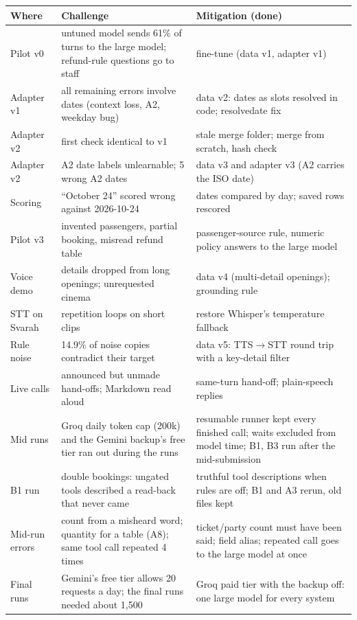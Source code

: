 \documentclass[11pt,a4paper]{article}
\newcommand{\cmd}[1]{{\small\ttfamily\def\_{\textunderscore\allowbreak}#1}}  %
\begin{document}
\begin{table}[tbp]
\centering\small
\begin{tabularx}{\linewidth}{@{}lLL@{}}
\toprule
Where & Challenge & Mitigation (done) \\
\midrule
Pilot v0 & untuned model sends 61\% of turns to the large model; refund-rule questions go to staff & fine-tune (data v1, adapter v1) \\
Adapter v1 & all remaining errors involve dates (context loss, A2, weekday bug) & data v2: dates as slots resolved in code; \cmd{resolve\_date} fix \\
Adapter v2 & first check identical to v1 & stale merge folder; merge from scratch, hash check \\
Adapter v2 & A2 date labels unlearnable; 5 wrong A2 dates & data v3 and adapter v3 (A2 carries the ISO date) \\
Scoring & ``October 24'' scored wrong against 2026-10-24 & dates compared by day; saved rows rescored \\
Pilot v3 & invented passengers, partial booking, misread refund table & passenger-source rule, numeric policy answers to the large model \\
Voice demo & details dropped from long openings; unrequested cinema & data v4 (multi-detail openings); grounding rule \\
STT on Svarah & repetition loops on short clips & restore Whisper's temperature fallback \\
Rule noise & 14.9\% of noise copies contradict their target & data v5: TTS$\rightarrow$STT round trip with a key-detail filter \\
Live calls & announced but unmade hand-offs; Markdown read aloud & same-turn hand-off; plain-speech replies \\
Mid runs & Groq daily token cap (200k) and the Gemini backup's free tier ran out during the runs & resumable runner kept every finished call; waits excluded from model time; B1, B3 run after the mid-submission \\
B1 run & double bookings: ungated tools described a read-back that never came & truthful tool descriptions when rules are off; B1 and A3 rerun, old files kept \\
Mid-run errors & count from a misheard word; \cmd{quantity} for a table (A8); same tool call repeated 4 times & ticket/party count must have been said; field alias; repeated call goes to the large model at once \\
Final runs & Gemini's free tier allows 20 requests a day; the final runs needed about 1,500 & Groq paid tier with the backup off: one large model for every system \\

\end{tabularx}
\end{table}
\end{document}
